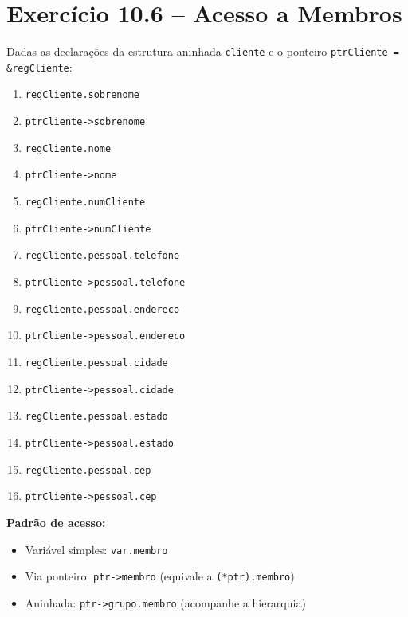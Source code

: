 \documentclass[12pt,a4paper]{article}
\begin{document}
\newpage

\section{Exercício 10.6 -- Acesso a Membros}

\begin{respostabox}
Dadas as declarações da estrutura aninhada \texttt{cliente} e o ponteiro
\texttt{ptrCliente = \&regCliente}:

\begin{enumerate}[label=\textbf{\alph*)}]
\item \texttt{regCliente.sobrenome}
\item \texttt{ptrCliente->sobrenome}
\item \texttt{regCliente.nome}
\item \texttt{ptrCliente->nome}
\item \texttt{regCliente.numCliente}
\item \texttt{ptrCliente->numCliente}
\item \texttt{regCliente.pessoal.telefone}
\item \texttt{ptrCliente->pessoal.telefone}
\item \texttt{regCliente.pessoal.endereco}
\item \texttt{ptrCliente->pessoal.endereco}
\item \texttt{regCliente.pessoal.cidade}
\item \texttt{ptrCliente->pessoal.cidade}
\item \texttt{regCliente.pessoal.estado}
\item \texttt{ptrCliente->pessoal.estado}
\item \texttt{regCliente.pessoal.cep}
\item \texttt{ptrCliente->pessoal.cep}
\end{enumerate}

\begin{boaprática}
  \textbf{Padrão de acesso:}
  \begin{itemize}[noitemsep]
    \item Variável simples: \texttt{var.membro}
    \item Via ponteiro: \texttt{ptr->membro} (equivale a \texttt{(*ptr).membro})
    \item Aninhada: \texttt{ptr->grupo.membro} (acompanhe a hierarquia)
  \end{itemize}
\end{boaprática}
\end{respostabox}
\end{document}
